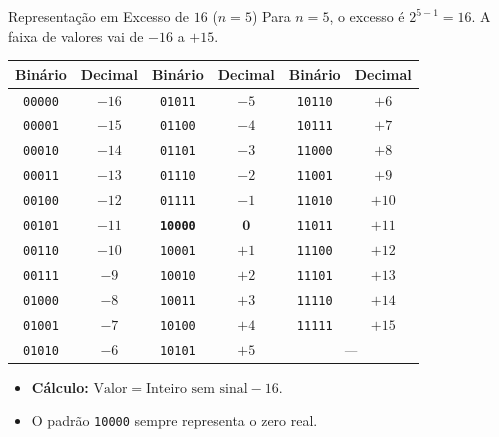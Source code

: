 \begin{frame}{Representação em Excesso de $16$ ($n=5$)}
    Para $n=5$, o excesso é $2^{5-1} = 16$. A faixa de valores vai de $-16$ a $+15$.

    \begin{center}
        \scriptsize
        \begin{tabular}{|c|c||c|c||c|c|}
            \hline
            \textbf{Binário} & \textbf{Decimal} & \textbf{Binário}        & \textbf{Decimal} & \textbf{Binário}                  & \textbf{Decimal} \\ \hline \hline
            \texttt{00000}   & $-16$            & \texttt{01011}          & $-5$             & \texttt{10110}                    & $+6$             \\ \hline
            \texttt{00001}   & $-15$            & \texttt{01100}          & $-4$             & \texttt{10111}                    & $+7$             \\ \hline
            \texttt{00010}   & $-14$            & \texttt{01101}          & $-3$             & \texttt{11000}                    & $+8$             \\ \hline
            \texttt{00011}   & $-13$            & \texttt{01110}          & $-2$             & \texttt{11001}                    & $+9$             \\ \hline
            \texttt{00100}   & $-12$            & \texttt{01111}          & $-1$             & \texttt{11010}                    & $+10$            \\ \hline
            \texttt{00101}   & $-11$            & \textbf{\texttt{10000}} & $\mathbf{0}$     & \texttt{11011}                    & $+11$            \\ \hline
            \texttt{00110}   & $-10$            & \texttt{10001}          & $+1$             & \texttt{11100}                    & $+12$            \\ \hline
            \texttt{00111}   & $-9$             & \texttt{10010}          & $+2$             & \texttt{11101}                    & $+13$            \\ \hline
            \texttt{01000}   & $-8$             & \texttt{10011}          & $+3$             & \texttt{11110}                    & $+14$            \\ \hline
            \texttt{01001}   & $-7$             & \texttt{10100}          & $+4$             & \texttt{11111}                    & $+15$            \\ \hline
            \texttt{01010}   & $-6$             & \texttt{10101}          & $+5$             & \multicolumn{2}{c|}{\textit{---}}                    \\ \hline
        \end{tabular}
    \end{center}

    \begin{itemize}
        \item \textbf{Cálculo:} $\text{Valor} = \text{Inteiro sem sinal} - 16$.
        \item O padrão \texttt{10000} sempre representa o zero real.
    \end{itemize}
\end{frame}

